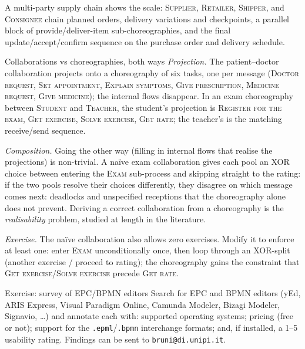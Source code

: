 A multi-party supply chain shows the scale: \textsc{Supplier}, \textsc{Retailer}, \textsc{Shipper}, and \textsc{Consignee} chain planned orders, delivery variations and checkpoints, a parallel block of provide/deliver-item sub-choreographies, and the final update/accept/confirm sequence on the purchase order and delivery schedule.

\begin{examplebox}{Collaborations vs choreographies, both ways}
\emph{Projection.} The patient--doctor collaboration projects onto a choreography of six tasks, one per message (\textsc{Doctor request}, \textsc{Set appointment}, \textsc{Explain symptoms}, \textsc{Give prescription}, \textsc{Medicine request}, \textsc{Give medicine}); the internal flows disappear. In an exam choreography between \textsc{Student} and \textsc{Teacher}, the student's projection is \textsc{Register for the exam}, \textsc{Get exercise}, \textsc{Solve exercise}, \textsc{Get rate}; the teacher's is the matching receive/send sequence.
\par\smallskip
\emph{Composition.} Going the other way (filling in internal flows that realise the projections) is non-trivial. A na\"ive exam collaboration gives each pool an XOR choice between entering the \textsc{Exam} sub-process and skipping straight to the rating: if the two pools resolve their choices differently, they disagree on which message comes next: deadlocks and unspecified receptions that the choreography alone does not prevent. Deriving a correct collaboration from a choreography is the \emph{realisability} problem, studied at length in the literature.
\par\smallskip
\emph{Exercise.} The na\"ive collaboration also allows zero exercises. Modify it to enforce at least one: enter \textsc{Exam} unconditionally once, then loop through an XOR-split (another exercise / proceed to rating); the choreography gains the constraint that \textsc{Get exercise}/\textsc{Solve exercise} precede \textsc{Get rate}.
\end{examplebox}

\begin{examplebox}{Exercise: survey of EPC/BPMN editors}
Search for EPC and BPMN editors (yEd, ARIS Express, Visual Paradigm Online, Camunda Modeler, Bizagi Modeler, Signavio, \dots) and annotate each with: supported operating systems; pricing (free or not); support for the \texttt{.epml}/\texttt{.bpmn} interchange formats; and, if installed, a 1--5 usability rating. Findings can be sent to \texttt{bruni@di.unipi.it}.
\end{examplebox}

